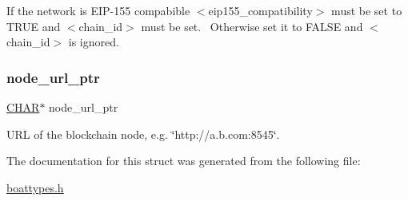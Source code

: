 If the network is E\+I\+P-\/155 compabible $<$eip155\+\_\+compatibility$>$ must be set to T\+R\+UE and $<$chain\+\_\+id$>$ must be set.~\newline
Otherwise set it to F\+A\+L\+SE and $<$chain\+\_\+id$>$ is ignored. \mbox{\label{struct_t_network_info_af9c1bd4a0bd9c92244377526eb17a176}} 
\subsubsection{\texorpdfstring{node\+\_\+url\+\_\+ptr}{node\_url\_ptr}}
{\footnotesize\ttfamily \mbox{\hyperlink{boattypes_8h_aebb9e13210d88d43e32e735ada43a425}{C\+H\+AR}}$\ast$ node\+\_\+url\+\_\+ptr}



U\+RL of the blockchain node, e.\+g. \char`\"{}http\+://a.\+b.\+com\+:8545\char`\"{}. 



The documentation for this struct was generated from the following file\+:\begin{DoxyCompactItemize}
\item 
\mbox{\hyperlink{boattypes_8h}{boattypes.\+h}}\end{DoxyCompactItemize}
